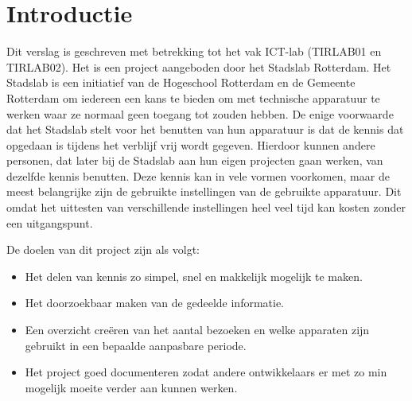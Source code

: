 \chapter{Introductie}

Dit verslag is geschreven met betrekking tot het vak ICT-lab (TIRLAB01 en TIRLAB02). Het is een project aangeboden door het Stadslab Rotterdam. Het Stadslab is een initiatief van de Hogeschool Rotterdam en de Gemeente Rotterdam om iedereen een kans te bieden om met technische apparatuur te werken waar ze normaal geen toegang tot zouden hebben. De enige voorwaarde dat het Stadslab stelt voor het benutten van hun apparatuur is dat de kennis dat opgedaan is tijdens het verblijf vrij wordt gegeven. Hierdoor kunnen andere personen, dat later bij de Stadslab aan hun eigen projecten gaan werken, van dezelfde kennis benutten. Deze kennis kan in vele vormen voorkomen, maar de meest belangrijke zijn de gebruikte instellingen van de gebruikte apparatuur. Dit omdat het uittesten van verschillende instellingen heel veel tijd kan kosten zonder een uitgangspunt.


De doelen van dit project zijn als volgt:
\begin {itemize}
\item Het delen van kennis zo simpel, snel en makkelijk mogelijk te maken.
\item Het doorzoekbaar maken van de gedeelde informatie.	
\item Een overzicht cre\"eren van het aantal bezoeken en welke apparaten zijn gebruikt in een bepaalde aanpasbare periode.
\item Het project goed documenteren zodat andere ontwikkelaars er met zo min mogelijk moeite verder aan kunnen werken.
\end {itemize}